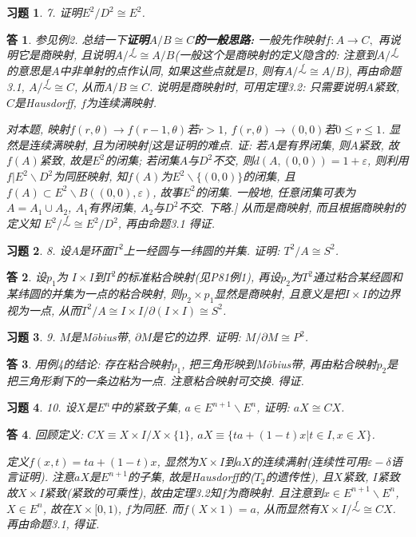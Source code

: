 \documentclass{ctexart}%
\newtheorem*{exercise}{习题}
\newtheorem*{solution}{答}
\theoremstyle{definition}
\theoremstyle{remark}
\begin{document}
\begin{exercise}7. 证明$E^2/D^2\cong E^2$.
\end{exercise}
\begin{solution}
参见例2. 总结一下\textbf{证明$A\slash B\cong C$的一般思路:} 一般先作映射$f: A\rightarrow C, $ 再说明它是商映射, 且说明$A\slash \overset{f}{\sim} \cong A\slash B$(一般这个是商映射的定义隐含的: 注意到$A/\overset{f}{\sim}$的意思是$A$中非单射的点作认同, 如果这些点就是$B$, 则有$A\slash \overset{f}{\sim} \cong A\slash B$), 再由命题3.1, $A\slash \overset{f}{\sim}\cong C$, 从而$A\slash B\cong C$. 说明是商映射时, 可用定理3.2: 只需要说明$A$紧致, $C$是Hausdorff, $f$为连续满映射.

对本题, 映射$f(r,\theta)\rightarrow f(r-1,\theta)$若$r>1$, $f(r,\theta)\rightarrow (0,0)$若$0\leq r\leq 1$. 显然是连续满映射, 且为闭映射[这是证明的难点. 证: 若$A$是有界闭集, 则$A$紧致, 故$f(A)$紧致, 故是$E^2$的闭集; 若闭集$A$与$D^2$不交, 则$d(A,(0,0))=1+\varepsilon$, 则利用$f|E^2\backslash D^2$为同胚映射, 知$f(A)$为$E^2\backslash\{(0,0)\}$的闭集, 且$f(A)\subset E^2\backslash B((0,0),\varepsilon)$, 故事$E^2$的闭集. 一般地, 任意闭集可表为$A=A_1\cup A_2$, $A_1$有界闭集, $A_2$与$D^2$不交. 下略.] 从而是商映射, 而且根据商映射的定义知 $E^2 \slash \overset{f}{\sim} \cong E^2\slash D^2$, 再由命题3.1 得证. 
\end{solution}

\begin{exercise}8. 设$A$是环面$T^2$上一经圆与一纬圆的并集. 证明: $T^2\slash A \cong S^2$.
\end{exercise}
\begin{solution}
设$p_1$为 $I\times I$到$T^2$的标准粘合映射(见P81例1), 再设$p_2$为$T^2$通过粘合某经圆和某纬圆的并集为一点的粘合映射, 则$p_2\times p_1$显然是商映射, 且意义是把$I\times I$的边界视为一点, 从而$T^2\slash A
\cong I\times I/\partial(I\times I) \cong S^2$.
\end{solution}

\begin{exercise}9. $M$是M\"{o}bius带, $\partial M$是它的边界. 证明: $M\slash \partial M \cong P^2$.
\end{exercise}
\begin{solution}用例4的结论: 存在粘合映射$p_1$, 把三角形映到M\"{o}bius带, 再由粘合映射$p_2$是把三角形剩下的一条边粘为一点. 注意粘合映射可交换. 得证. 
\end{solution}

\begin{exercise}10. 设$X$是$E^n$中的紧致子集, $a\in E^{n+1}\backslash E^n$, 证明: $ aX\cong CX$.
\end{exercise}
\begin{solution}
回顾定义: $CX\equiv X\times I\slash X\times \{1\}$, $aX \equiv \{ta+(1-t)x|t\in I, x\in X\}$. 

定义$f(x,t)=ta+(1-t)x$, 显然为$X\times I$到$aX$的连续满射(连续性可用$\varepsilon-\delta$语言证明). 注意$aX$是$E^{n+1}$的子集, 故是Hausdorff的($T_2$的遗传性), 且$X$紧致, $I$紧致故$X\times I$紧致(紧致的可乘性), 故由定理3.2知$f$为商映射. 且注意到$x\in E^{n+1}\backslash E^n$, $X\in E^n$, 故在$X\times [0,1)$, $f$为同胚. 而$f(X\times 1)=a$, 从而显然有$X\times I\slash \overset{f}{\sim}\cong CX$. 再由命题3.1, 得证. 
\end{solution}
\end{document}
